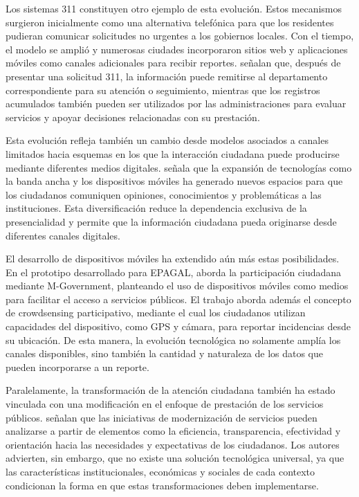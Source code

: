 Los sistemas 311 constituyen otro ejemplo de esta evolución. Estos mecanismos surgieron inicialmente como una alternativa telefónica para que los residentes pudieran comunicar solicitudes no urgentes a los gobiernos locales. Con el tiempo, el modelo se amplió y numerosas ciudades incorporaron sitios web y aplicaciones móviles como canales adicionales para recibir reportes. \textcite{cook2024potholes} señalan que, después de presentar una solicitud 311, la información puede remitirse al departamento correspondiente para su atención o seguimiento, mientras que los registros acumulados también pueden ser utilizados por las administraciones para evaluar servicios y apoyar decisiones relacionadas con su prestación.

Esta evolución refleja también un cambio desde modelos asociados a canales limitados hacia esquemas en los que la interacción ciudadana puede producirse mediante diferentes medios digitales. \cite{hubert2021herramientas} señala que la expansión de tecnologías como la banda ancha y los dispositivos móviles ha generado nuevos espacios para que los ciudadanos comuniquen opiniones, conocimientos y problemáticas a las instituciones. Esta diversificación reduce la dependencia exclusiva de la presencialidad y permite que la información ciudadana pueda originarse desde diferentes canales digitales.

El desarrollo de dispositivos móviles ha extendido aún más estas posibilidades. En el prototipo desarrollado para EPAGAL, \cite{rodriguezdesarrollo} aborda la participación ciudadana mediante M-Government, planteando el uso de dispositivos móviles como medios para facilitar el acceso a servicios públicos. El trabajo aborda además el concepto de crowdsensing participativo, mediante el cual los ciudadanos utilizan capacidades del dispositivo, como GPS y cámara, para reportar incidencias desde su ubicación. De esta manera, la evolución tecnológica no solamente amplía los canales disponibles, sino también la cantidad y naturaleza de los datos que pueden incorporarse a un reporte.

Paralelamente, la transformación de la atención ciudadana también ha estado vinculada con una modificación en el enfoque de prestación de los servicios públicos. \cite{fariastendencias} señalan que las iniciativas de modernización de servicios pueden analizarse a partir de elementos como la eficiencia, transparencia, efectividad y orientación hacia las necesidades y expectativas de los ciudadanos. Los autores advierten, sin embargo, que no existe una solución tecnológica universal, ya que las características institucionales, económicas y sociales de cada contexto condicionan la forma en que estas transformaciones deben implementarse.

